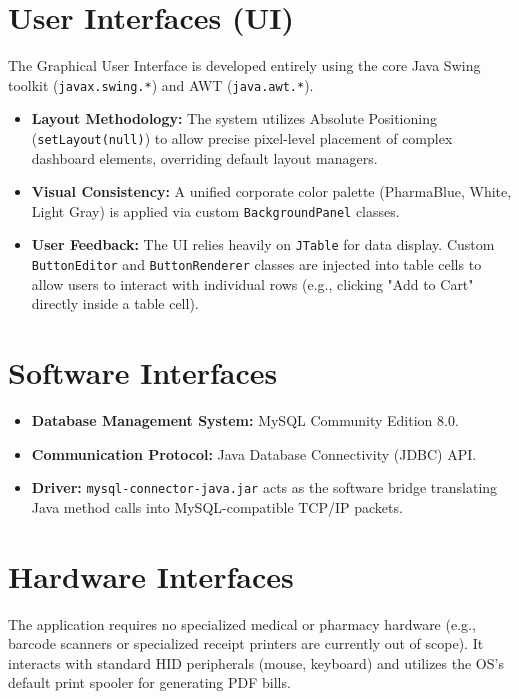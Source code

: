 \documentclass[12pt,a4paper]{report}
\begin{document}
\section{User Interfaces (UI)}
The Graphical User Interface is developed entirely using the core Java Swing toolkit (\texttt{javax.swing.*}) and AWT (\texttt{java.awt.*}).
\begin{itemize}
    \item \textbf{Layout Methodology:} The system utilizes Absolute Positioning (\texttt{setLayout(null)}) to allow precise pixel-level placement of complex dashboard elements, overriding default layout managers.
    \item \textbf{Visual Consistency:} A unified corporate color palette (PharmaBlue, White, Light Gray) is applied via custom \texttt{BackgroundPanel} classes.
    \item \textbf{User Feedback:} The UI relies heavily on \texttt{JTable} for data display. Custom \texttt{ButtonEditor} and \texttt{ButtonRenderer} classes are injected into table cells to allow users to interact with individual rows (e.g., clicking "Add to Cart" directly inside a table cell).
\end{itemize}

\section{Software Interfaces}
\begin{itemize}
    \item \textbf{Database Management System:} MySQL Community Edition 8.0.
    \item \textbf{Communication Protocol:} Java Database Connectivity (JDBC) API.
    \item \textbf{Driver:} \texttt{mysql-connector-java.jar} acts as the software bridge translating Java method calls into MySQL-compatible TCP/IP packets.
\end{itemize}

\section{Hardware Interfaces}
The application requires no specialized medical or pharmacy hardware (e.g., barcode scanners or specialized receipt printers are currently out of scope). It interacts with standard HID peripherals (mouse, keyboard) and utilizes the OS's default print spooler for generating PDF bills.

\clearpage
\end{document}

